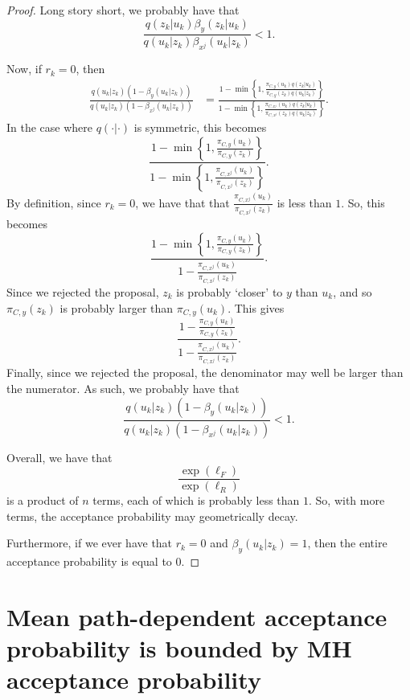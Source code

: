 \documentclass[12pt]{article}
\theoremstyle{definition}
\theoremstyle{remark}
\theoremstyle{plain}
\begin{document}
\begin{proof}
Long story short, we probably have that 
\[
  \frac{q(z_k|u_k) \beta_y(z_k|u_k)}{q(u_k|z_k) \beta_{x^j}(u_k|z_k)} < 1.
\]

Now, if $r_k = 0$, then
\begin{align*}
  \frac{q(u_k|z_k) (1-\beta_y(u_k|z_k))}{q(u_k|z_k) (1-\beta_{x^j}(u_k|z_k))}
  &= \frac{1 - \min\left\{1, \frac{\pi_{C,y}(u_k)q(z_k|u_k)}{\pi_{C,y}(z_k)q(u_k|z_k)}\right\}}{1 - \min\left\{1, \frac{\pi_{C,x^j}(u_k)q(z_k|u_k)}{\pi_{C,x^j}(z_k)q(u_k|z_k)}\right\}}.
\end{align*}
In the case where $q(\cdot|\cdot)$ is symmetric, this becomes 
\[
  \frac{1 - \min\left\{1, \frac{\pi_{C,y}(u_k)}{\pi_{C,y}(z_k)}\right\}}{1 - \min\left\{1, \frac{\pi_{C,x^j}(u_k)}{\pi_{C,x^j}(z_k)}\right\}}.
\]
By definition, since $r_k = 0$, we have that that $\frac{\pi_{C,x^j}(u_k)}{\pi_{C,x^j}(z_k)}$ is less than $1$. 
So, this becomes 
\[
  \frac{1 - \min\left\{1, \frac{\pi_{C,y}(u_k)}{\pi_{C,y}(z_k)}\right\}}{1 - \frac{\pi_{C,x^j}(u_k)}{\pi_{C,x^j}(z_k)}}.
\]
Since we rejected the proposal, $z_k$ is probably `closer' to $y$ than $u_k$, 
and so $\pi_{C,y}(z_k)$ is probably larger than $\pi_{C,y}(u_k)$. This gives
\[
  \frac{1 - \frac{\pi_{C,y}(u_k)}{\pi_{C,y}(z_k)}}{1 - \frac{\pi_{C,x^j}(u_k)}{\pi_{C,x^j}(z_k)}}.
\]
Finally, since we rejected the proposal, the denominator may well be larger than the numerator.
As such, we probably have that
\[
  \frac{q(u_k|z_k) (1-\beta_y(u_k|z_k))}{q(u_k|z_k) (1-\beta_{x^j}(u_k|z_k))} < 1.
\]

Overall, we have that 
\[  
  \frac{\exp\left(\ell_F\right)}{\exp\left(\ell_R\right)}
\]
is a product of $n$ terms, each of which is probably less than $1$. 
So, with more terms, the acceptance probability may geometrically decay. 

Furthermore, if we ever have that 
$r_k=0$ and $\beta_{y}(u_k|z_k) = 1$, 
then the entire acceptance probability is equal to $0$.
\end{proof}


\section{Mean path-dependent acceptance probability is bounded by MH acceptance probability}
\end{document}
